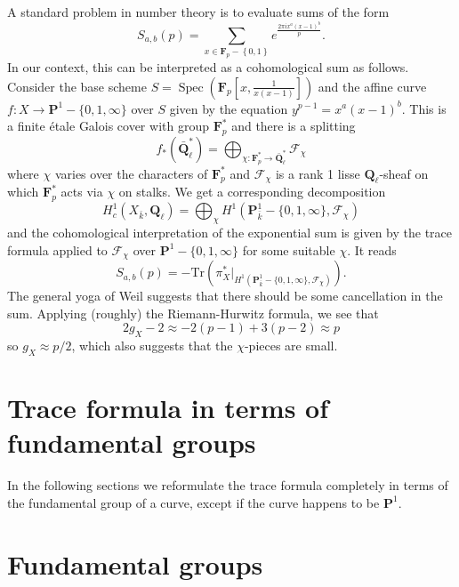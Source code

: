 \documentclass{stacks-project}
\theoremstyle{plain}
\theoremstyle{definition}
\theoremstyle{remark}
\numberwithin{equation}{subsection}
\def\Spec{\mathop{\mathrm{Spec}}}
\begin{document}
\noindent
A standard problem in number theory is to evaluate sums of the form
$$
S_{a, b}(p) = \sum_{x\in \mathbf{F}_p - \left\{0, 1\right\}} e^{\frac{2\pi
ix^a(x - 1)^b}{p}}.
$$
In our context, this can be interpreted as a cohomological sum as follows.
Consider the base scheme
$S = \Spec(\mathbf{F}_p[x, \frac{1}{x(x - 1)}])$ and the affine curve
$f : X \to \mathbf{P}^1-\{0, 1, \infty\}$ over $S$ given by the equation
$y^{p - 1} = x^a(x - 1)^b$. This is a finite \'etale Galois cover with group
$\mathbf{F}_p^*$ and there is a splitting
$$
f_*(\bar{\mathbf{Q}}_\ell^*) =
\bigoplus_{\chi : \mathbf{F}_p^*\to \bar{\mathbf{Q}}_\ell^*} \mathcal{F}_\chi
$$
where $\chi$ varies over the characters of $\mathbf{F}_p^*$ and
$\mathcal{F}_\chi$ is a rank 1 lisse $\mathbf{Q}_\ell$-sheaf on which
$\mathbf{F}_p^*$ acts via $\chi$ on stalks. We get a corresponding decomposition
$$
H_c^1(X_{\bar k}, \mathbf{Q}_\ell) = \bigoplus_\chi H^1(\mathbf{P}_{\bar
k}^1-\{0, 1, \infty\}, \mathcal{F}_\chi)
$$
and the cohomological interpretation of the exponential sum is given by the
trace formula applied to $\mathcal{F}_\chi$ over $\mathbf{P}^1 - \{0, 1,
\infty\}$ for some suitable $\chi$. It reads
$$
S_{a, b}(p) =
-\text{Tr}(\pi_X^*
|_{H^1(\mathbf{P}_{\bar k}^1-\{0, 1, \infty\}, \mathcal{F}_\chi)}).
$$
The general yoga of Weil suggests that there should be some cancellation in the
sum. Applying (roughly) the Riemann-Hurwitz formula, we see that
$$
2g_X-2 \approx -2 (p-1) + 3(p-2) \approx p
$$
so $g_X\approx p/2$, which also suggests that the $\chi$-pieces are small.



\section{Trace formula in terms of fundamental groups}
\label{section-trace-formula-fundamental-group}

\noindent
In the following sections we reformulate the trace formula completely
in terms of the fundamental group of a curve, except if the curve
happens to be $\mathbf{P}^1$.




\section{Fundamental groups}
\label{section-fundamental-groups}
\end{document}
